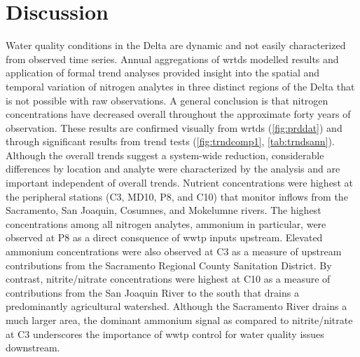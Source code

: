 \documentclass[letterpaper,12pt,oneside]{article}\usepackage[]{graphicx}\usepackage[]{color}
\begin{document}
\section{Discussion}

Water quality conditions in the Delta are dynamic and not easily characterized from observed time series.  Annual aggregations of \ac{wrtds} modelled results and application of formal trend analyses provided insight into the spatial and temporal variation of nitrogen analytes in three distinct regions of the Delta that is not possible with raw observations.  A general conclusion is that nitrogen concentrations have decreased overall throughout the approximate forty years of observation.  These results are confirmed visually from \ac{wrtds} (\cref{fig:prddat}) and through significant results from trend tests (\cref{fig:trndcomp1}, \cref{tab:trndsann}).  Although the overall trends suggest a system-wide reduction, considerable differences by location and analyte were characterized by the analysis and are important independent of overall trends.  Nutrient concentrations were highest at the peripheral stations (C3, MD10, P8, and C10) that monitor inflows from the Sacramento, San Joaquin, Cosumnes, and Mokelumne rivers.  The highest concentrations among all nitrogen analytes, ammonium in particular, were observed at P8 as a direct consquence of \ac{wwtp} inputs upstream.  Elevated ammonium concentrations were also observed at C3 as a measure of upstream contributions from the Sacramento Regional County Sanitation District.  By contrast, nitrite/nitrate concentrations were highest at C10 as a measure of contributions from the San Joaquin River to the south that drains a predominantly agricultural watershed.  Although the Sacramento River drains a much larger area, the dominant ammonium signal as compared to nitrite/nitrate at C3 underscores the importance of \ac{wwtp} control for water quality issues downstream.  
\end{document}
